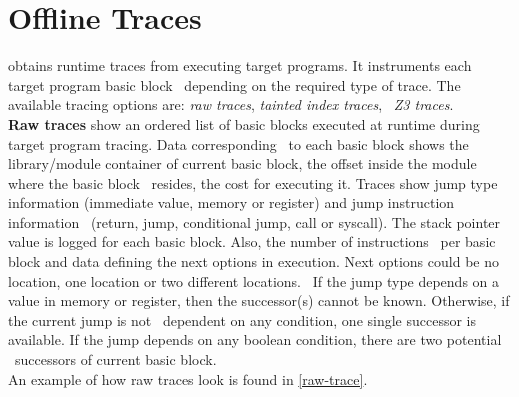 \documentclass[format=acmsmall]{acmart}
\author{Teodor Stoenescu}
\affiliation{%
  \institution{Bitdefender}
  \city{Bucharest}
  \country{Romania}}
\author{Alexandra Sandulescu}
\affiliation{%
  \institution{Bitdefender}
  \city{Bucharest}
  \country{Romania}}
\title{\mytitle}
\newcommand{\allcaps}[1]{\texorpdfstring{\textsmaller[.5]{#1}}{#1}\xspace}
\newcommand{\river}{\allcaps{RIVER}}
\begin{document}
\begin{abstract}

\end{abstract}

\maketitle
\renewcommand{\shortauthors}{T. Stoenescu, A. Sandulescu}

\section{\river Offline Traces}
\river obtains runtime traces from executing target programs. It instruments each target program basic block \
depending on the required type of trace. The available tracing options are: \textit{raw traces}, \textit{tainted index traces}, \
\textit{Z3 traces}. \\
\textbf{Raw traces} show an ordered list of basic blocks executed at runtime during target program tracing. Data corresponding \
to each basic block shows the library/module container of current basic block, the offset inside the module where the basic block \
resides, the cost for executing it. Traces show jump type information (immediate value, memory or register) and jump instruction information \
(return, jump, conditional jump, call or syscall). The stack pointer value is logged for each basic block. Also, the number of instructions \
per basic block and data defining the next options in execution. Next options could be no location, one location or two different locations. \
If the jump type depends on a value in memory or register, then the successor(s) cannot be known. Otherwise, if the current jump is not \
dependent on any condition, one single successor is available. If the jump depends on any boolean condition, there are two potential \
successors of current basic block. \\
An example of how raw traces look is found in \autoref{raw-trace}.
\end{document}
